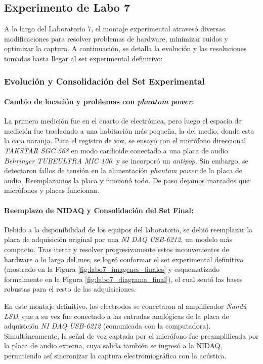 \newpage

\subsection{Experimento de Labo 7}

A lo largo del Laboratorio 7, el montaje experimental atravesó diversas modificaciones para resolver problemas de hardware, minimizar ruidos y optimizar la captura. A continuación, se detalla la evolución y las resoluciones tomadas hasta llegar al set experimental definitivo:

\subsubsection{Evolución y Consolidación del Set Experimental}

\paragraph{Cambio de locación y problemas con \textit{phantom power}:}
La primera medición fue en el cuarto de electrónica, pero luego el espacio de medición fue trasladado a una habitación más pequeña, la del medio, donde esta la caja
naranja. Para el registro de voz, se ensayó con el micrófono direccional \textit{TAKSTAR SGC 568} en modo cardioide conectado a una placa de audio 
\textit{Behringer TUBEULTRA MIC 100}, y se incorporó un \textit{antipop}. Sin embargo, se detectaron fallos de tensión en la alimentación \textit{phantom power} de la
 placa de audio. Reemplazamos la placa y funcionó todo. De paso dejamos marcados que micrófonos y placas funcionan.

\paragraph{Reemplazo de NIDAQ y Consolidación del Set Final:}
Debido a la disponibilidad de los equipos del laboratorio, se debió reemplazar la placa de adquisición original por una \textit{NI DAQ USB-6212}, un modelo más compacto. Tras iterar y resolver progresivamente estos inconvenientes de hardware a lo largo del mes, se logró conformar el set experimental definitivo (mostrado en la Figura \ref{fig:labo7_imagenes_finales} y esquematizado formalmente en la Figura \ref{fig:labo7_diagrama_final}), el cual sentó las bases robustas para el resto de las adquisiciones. 

En este montaje definitivo, los electrodos se conectaron al amplificador \textit{Ñandú LSD}, que a su vez fue conectado a las entradas analógicas de la placa de adquisición \textit{NI DAQ USB-6212} (comunicada con la computadora). Simultáneamente, la señal de voz captada por el micrófono fue preamplificada por la placa de audio externa, cuya salida también se ingresó a la NIDAQ, permitiendo así sincronizar la captura electromiográfica con la acústica.

